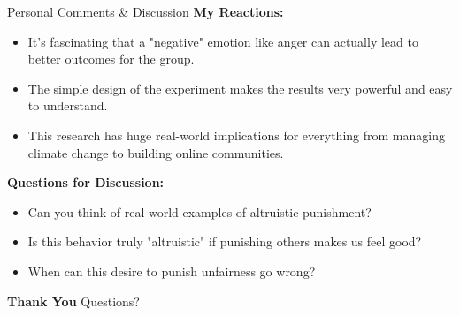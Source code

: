 \documentclass{beamer}
\begin{document}
\begin{frame}{Personal Comments \& Discussion}
    \textbf{My Reactions:}
    \begin{itemize}
        \item It's fascinating that a "negative" emotion like anger can actually lead to better outcomes for the group.
        \item The simple design of the experiment makes the results very powerful and easy to understand.
        \item This research has huge real-world implications for everything from managing climate change to building online communities.
    \end{itemize}
    \vspace{1cm}
    \textbf{Questions for Discussion:}
    \begin{itemize}
        \item Can you think of real-world examples of altruistic punishment?
        \item Is this behavior truly "altruistic" if punishing others makes us feel good?
        \item When can this desire to punish unfairness go wrong?
    \end{itemize}
\end{frame}

\begin{frame}
    \begin{center}
        \Huge{\textbf{Thank You}}
        \vspace{2cm}
        \Large{Questions?}
    \end{center}
\end{frame}
\end{document}
